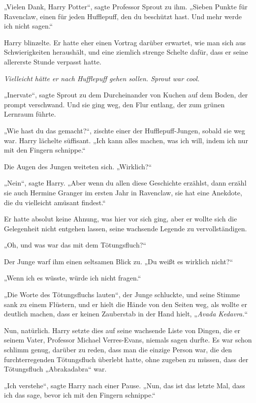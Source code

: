{„Vielen Dank, Harry Potter“, sagte Professor Sprout zu ihm. „Sieben Punkte für Ravenclaw, einen für jeden Hufflepuff, den du beschützt hast. Und mehr werde ich nicht sagen.“

Harry blinzelte. Er hatte eher einen Vortrag darüber erwartet, wie man sich aus Schwierigkeiten heraushält, und eine ziemlich strenge Schelte dafür, dass er seine allererste Stunde verpasst hatte.

\emph{Vielleicht hätte er nach Hufflepuff gehen sollen. Sprout war cool.}

„Inervate“, sagte Sprout zu dem Durcheinander von Kuchen auf dem Boden, der prompt verschwand. Und sie ging weg, den Flur entlang, der zum grünen Lernraum führte.

„Wie hast du das gemacht?“, zischte einer der Hufflepuff-Jungen, sobald sie weg war. Harry lächelte süffisant. „Ich kann alles machen, was ich will, indem ich nur mit den Fingern schnippe.“

Die Augen des Jungen weiteten sich. „Wirklich?“

„Nein“, sagte Harry. „Aber wenn du allen diese Geschichte erzählst, dann erzähl sie auch Hermine Granger im ersten Jahr in Ravenclaw, sie hat eine Anekdote, die du vielleicht amüsant findest.“

Er hatte absolut keine Ahnung, was hier vor sich ging, aber er wollte sich die Gelegenheit nicht entgehen lassen, seine wachsende Legende zu vervollständigen.

„Oh, und was war das mit dem Tötungsfluch?“

Der Junge warf ihm einen seltsamen Blick zu. „Du weißt es wirklich nicht?“

„Wenn ich es wüsste, würde ich nicht fragen.“

„Die Worte des Tötungsfluchs lauten“, der Junge schluckte, und seine Stimme sank zu einem Flüstern, und er hielt die Hände von den Seiten weg, als wollte er deutlich machen, dass er keinen Zauberstab in der Hand hielt, „\emph{Avada Kedavra.}“

Nun, natürlich. Harry setzte dies auf seine wachsende Liste von Dingen, die er seinem Vater, Professor Michael Verres-Evans, niemals sagen durfte. Es war schon schlimm genug, darüber zu reden, dass man die einzige Person war, die den furchterregenden Tötungsfluch überlebt hatte, ohne zugeben zu müssen, dass der Tötungsfluch „Abrakadabra“ war.

„Ich verstehe“, sagte Harry nach einer Pause. „Nun, das ist das letzte Mal, dass ich das sage, bevor ich mit den Fingern schnippe.“

}

